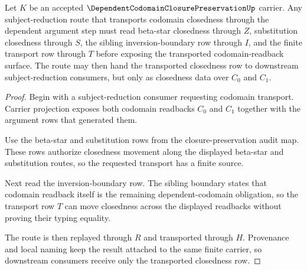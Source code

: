 \begin{theorem}
\label{thm:dependent-codomain-closure-preservation-transport}
Let $K$ be an accepted $\DependentCodomainClosurePreservationUp$ carrier. Any subject-reduction route that transports codomain closedness through the dependent argument step must read beta-star closedness through $Z$, substitution closedness through $S$, the sibling inversion-boundary row through $I$, and the finite transport row through $T$ before exposing the transported codomain-readback surface. The route may then hand the transported closedness row to downstream subject-reduction consumers, but only as closedness data over $C_0$ and $C_1$.
\end{theorem}
\begin{proof}
Begin with a subject-reduction consumer requesting codomain transport. Carrier projection exposes both codomain readbacks $C_0$ and $C_1$ together with the argument rows that generated them.

Use the beta-star and substitution rows from the closure-preservation audit map. These rows authorize closedness movement along the displayed beta-star and substitution routes, so the requested transport has a finite source.

Next read the inversion-boundary row. The sibling boundary states that codomain readback itself is the remaining dependent-codomain obligation, so the transport row $T$ can move closedness across the displayed readbacks without proving their typing equality.

The route is then replayed through $R$ and transported through $H$. Provenance and local naming keep the result attached to the same finite carrier, so downstream consumers receive only the transported closedness row.
\end{proof}


